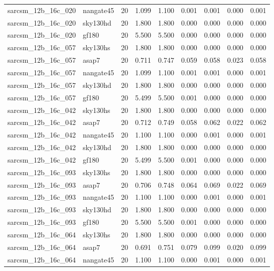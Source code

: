 \begin{tabular}{llrrrrrrr}
sarcsm\_12b\_16c\_020 & nangate45 & 20 & 1.099 & 1.100 & 0.001 & 0.001 & 0.000 & 0.001 \\
sarcsm\_12b\_16c\_020 & sky130hd & 20 & 1.800 & 1.800 & 0.000 & 0.000 & 0.000 & 0.000 \\
sarcsm\_12b\_16c\_020 & gf180 & 20 & 5.500 & 5.500 & 0.000 & 0.000 & 0.000 & 0.000 \\
sarcsm\_12b\_16c\_057 & sky130hs & 20 & 1.800 & 1.800 & 0.000 & 0.000 & 0.000 & 0.000 \\
sarcsm\_12b\_16c\_057 & asap7 & 20 & 0.711 & 0.747 & 0.059 & 0.058 & 0.023 & 0.058 \\
sarcsm\_12b\_16c\_057 & nangate45 & 20 & 1.099 & 1.100 & 0.001 & 0.001 & 0.000 & 0.001 \\
sarcsm\_12b\_16c\_057 & sky130hd & 20 & 1.800 & 1.800 & 0.000 & 0.000 & 0.000 & 0.000 \\
sarcsm\_12b\_16c\_057 & gf180 & 20 & 5.499 & 5.500 & 0.001 & 0.000 & 0.000 & 0.000 \\
sarcsm\_12b\_16c\_042 & sky130hs & 20 & 1.800 & 1.800 & 0.000 & 0.000 & 0.000 & 0.000 \\
sarcsm\_12b\_16c\_042 & asap7 & 20 & 0.712 & 0.749 & 0.058 & 0.062 & 0.022 & 0.062 \\
sarcsm\_12b\_16c\_042 & nangate45 & 20 & 1.100 & 1.100 & 0.000 & 0.001 & 0.000 & 0.001 \\
sarcsm\_12b\_16c\_042 & sky130hd & 20 & 1.800 & 1.800 & 0.000 & 0.000 & 0.000 & 0.000 \\
sarcsm\_12b\_16c\_042 & gf180 & 20 & 5.499 & 5.500 & 0.001 & 0.000 & 0.000 & 0.000 \\
sarcsm\_12b\_16c\_093 & sky130hs & 20 & 1.800 & 1.800 & 0.000 & 0.000 & 0.000 & 0.000 \\
sarcsm\_12b\_16c\_093 & asap7 & 20 & 0.706 & 0.748 & 0.064 & 0.069 & 0.022 & 0.069 \\
sarcsm\_12b\_16c\_093 & nangate45 & 20 & 1.100 & 1.100 & 0.000 & 0.001 & 0.000 & 0.001 \\
sarcsm\_12b\_16c\_093 & sky130hd & 20 & 1.800 & 1.800 & 0.000 & 0.000 & 0.000 & 0.000 \\
sarcsm\_12b\_16c\_093 & gf180 & 20 & 5.500 & 5.500 & 0.001 & 0.000 & 0.000 & 0.000 \\
sarcsm\_12b\_16c\_064 & sky130hs & 20 & 1.800 & 1.800 & 0.000 & 0.000 & 0.000 & 0.000 \\
sarcsm\_12b\_16c\_064 & asap7 & 20 & 0.691 & 0.751 & 0.079 & 0.099 & 0.020 & 0.099 \\
sarcsm\_12b\_16c\_064 & nangate45 & 20 & 1.100 & 1.100 & 0.000 & 0.001 & 0.000 & 0.001 \\

\end{tabular}
